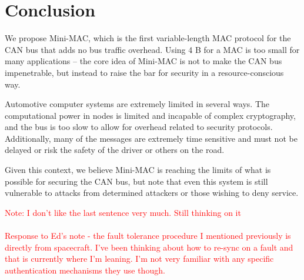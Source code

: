 \section{Conclusion}

We propose Mini-MAC, which is the first variable-length MAC protocol for the CAN bus that adds no bus traffic overhead. Using 4 B for a MAC is too small for many applications -- the core idea of Mini-MAC is not to make the CAN bus impenetrable, but instead to raise the bar for security in a resource-conscious way. 

Automotive computer systems are extremely limited in several ways. The computational power in nodes is limited and incapable of complex cryptography, and the bus is too slow to allow for overhead related to security protocols. Additionally, many of the messages are extremely time sensitive and must not be delayed or risk the safety of the driver or others on the road.

Given this context, we believe Mini-MAC is reaching the limits of what is possible for securing the CAN bus, but note that even this system is still vulnerable to attacks from determined attackers or those wishing to deny service.

\textcolor{red}{Note: I don't like the last sentence very much. Still thinking on it\\ \\Response to Ed's note - the fault tolerance procedure I mentioned previously is directly from spacecraft. I've been thinking about how to re-sync on a fault and that is currently where I'm leaning. I'm not very familiar with any specific authentication mechanisms they use though.}


